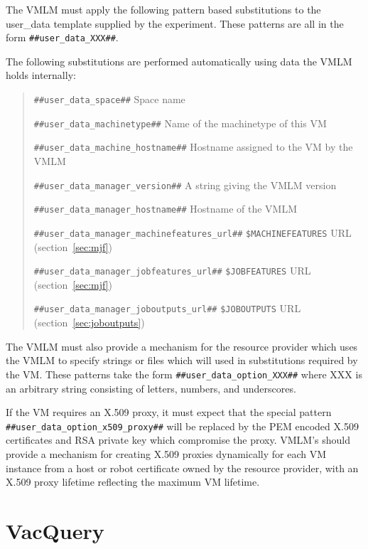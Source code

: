 \documentclass[12pt,a4paper]{article}
\begin{document}
The VMLM must apply the following pattern
based substitutions to the user\_data template supplied by the experiment.
These patterns are all in the form \texttt{\#\#user\_data\_XXX\#\#}.

The following substitutions are performed automatically
using data the VMLM holds internally:

\begin{quote}
\begin{description}
\setlength{\parskip}{0pt}
\item{\texttt{\#\#user\_data\_space\#\#}} Space name
\item{\texttt{\#\#user\_data\_machinetype\#\#}} Name of the machinetype of this VM
\item{\texttt{\#\#user\_data\_machine\_hostname\#\#}} Hostname assigned to the VM by the VMLM
\item{\texttt{\#\#user\_data\_manager\_version\#\#}} A string giving the VMLM version
\item{\texttt{\#\#user\_data\_manager\_hostname\#\#}} Hostname of the VMLM
\item{\texttt{\#\#user\_data\_manager\_machinefeatures\_url\#\#}} \texttt{\$MACHINEFEATURES} URL (section~\ref{sec:mjf})
\item{\texttt{\#\#user\_data\_manager\_jobfeatures\_url\#\#}} \texttt{\$JOBFEATURES} URL (section~\ref{sec:mjf})
\item{\texttt{\#\#user\_data\_manager\_joboutputs\_url\#\#}} \texttt{\$JOBOUTPUTS} URL (section~\ref{sec:joboutputs})
\end{description}
\end{quote}

The VMLM must also provide a mechanism for the resource provider which uses
the VMLM to specify strings or files which will used in substitutions
required by the VM. These patterns take the form
\texttt{\#\#user\_data\_option\_XXX\#\#} where XXX is an arbitrary string
consisting of letters, numbers, and underscores.

If the VM requires an X.509 proxy, it must expect that the special pattern
\texttt{\#\#user\_data\_option\_x509\_proxy\#\#} will be replaced by the 
PEM encoded X.509 certificates and RSA private key which compromise the
proxy. VMLM's should provide a mechanism for creating X.509 proxies
dynamically for each VM instance from a host or robot certificate owned
by the resource provider, with an X.509 proxy lifetime reflecting
the maximum VM lifetime.

\section{VacQuery}
\label{sec:vacquery}
\end{document}
